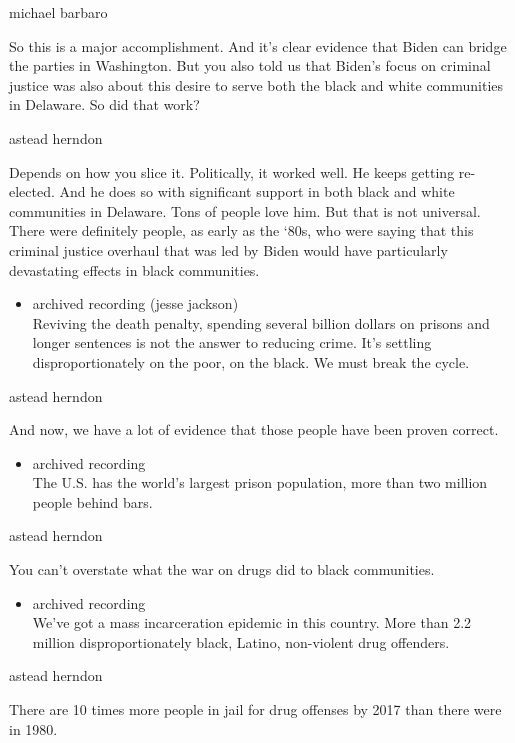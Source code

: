 michael barbaro

So this is a major accomplishment. And it's clear evidence that Biden
can bridge the parties in Washington. But you also told us that Biden's
focus on criminal justice was also about this desire to serve both the
black and white communities in Delaware. So did that work?

astead herndon

Depends on how you slice it. Politically, it worked well. He keeps
getting re-elected. And he does so with significant support in both
black and white communities in Delaware. Tons of people love him. But
that is not universal. There were definitely people, as early as the
`80s, who were saying that this criminal justice overhaul that was led
by Biden would have particularly devastating effects in black
communities.

\begin{itemize}
\tightlist
\item
  archived recording (jesse jackson)\\
  Reviving the death penalty, spending several billion dollars on
  prisons and longer sentences is not the answer to reducing crime. It's
  settling disproportionately on the poor, on the black. We must break
  the cycle.
\end{itemize}

astead herndon

And now, we have a lot of evidence that those people have been proven
correct.

\begin{itemize}
\tightlist
\item
  archived recording\\
  The U.S. has the world's largest prison population, more than two
  million people behind bars.
\end{itemize}

astead herndon

You can't overstate what the war on drugs did to black communities.

\begin{itemize}
\tightlist
\item
  archived recording\\
  We've got a mass incarceration epidemic in this country. More than 2.2
  million disproportionately black, Latino, non-violent drug offenders.
\end{itemize}

astead herndon

There are 10 times more people in jail for drug offenses by 2017 than
there were in 1980.

